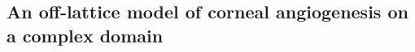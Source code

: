 \documentclass[superscriptaddress, a4paper]{article}
\begin{document}
\subsection{An off-lattice model of corneal angiogenesis on a complex domain}
\label{sec:an off-lattice model of corneal angiogenesis on a complex domain}



\end{document}
